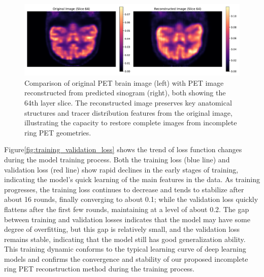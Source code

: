 \documentclass[
reprint,
superscriptaddress,
nofootinbib,
amsmath,amssymb,
aps,
prd,
]{revtex4-2}
\begin{document}
\begin{figure}[ht]
    \centering
    \includegraphics[width=\textwidth]{Images/compare_reconstruction_restoration}
    \vspace{-1cm}
    \caption{Comparison of original PET brain image (left) with PET image reconstructed from predicted sinogram (right), both showing the 64th layer slice. The reconstructed image preserves key anatomical structures and tracer distribution features from the original image, illustrating the capacity to restore complete images from incomplete ring PET geometries. 
    }
    \label{fig:pet_brain_reconstruction}
\end{figure}

Figure\ref{fig:training_validation_loss} shows the trend of loss function changes during the model training process. Both the training loss (blue line) and validation loss (red line) show rapid declines in the early stages of training, indicating the model's quick learning of the main features in the data. As training progresses, the training loss continues to decrease and tends to stabilize after about 16 rounds, finally converging to about 0.1; while the validation loss quickly flattens after the first few rounds, maintaining at a level of about 0.2. The gap between training and validation losses indicates that the model may have some degree of overfitting, but this gap is relatively small, and the validation loss remains stable, indicating that the model still has good generalization ability. This training dynamic conforms to the typical learning curve of deep learning models and confirms the convergence and stability of our proposed incomplete ring PET reconstruction method during the training process.
\end{document}
